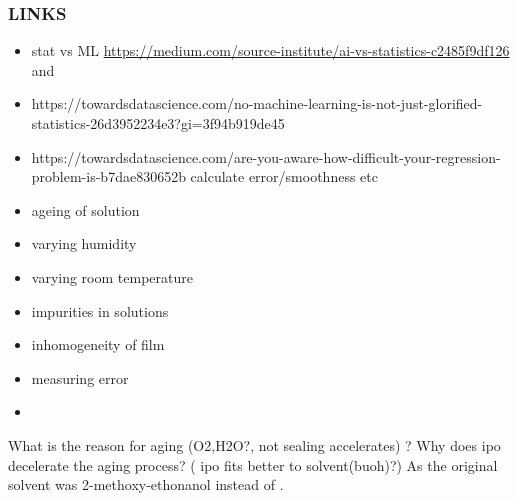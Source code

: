 \subsubsection{LINKS}
\begin{itemize}
    \item stat vs ML \url{https://medium.com/source-institute/ai-vs-statistics-c2485f9df126} and 
    \item https://towardsdatascience.com/no-machine-learning-is-not-just-glorified-statistics-26d3952234e3?gi=3f94b919de45
    \item https://towardsdatascience.com/are-you-aware-how-difficult-your-regression-problem-is-b7dae830652b calculate error/smoothness etc
\end{itemize}

\begin{itemize} 
    \item ageing of solution 
    \item varying humidity
    \item varying room temperature 
    \item impurities in solutions
    \item inhomogeneity of film 
    \item measuring error
    \item 
\end{itemize}

What is the reason for aging (O2,H2O?, not sealing accelerates) ? 
Why does \gls{ipo} decelerate the aging process? ( ipo fits better to solvent(buoh)?)
As the original solvent was 2-methoxy-ethonanol instead of . 
